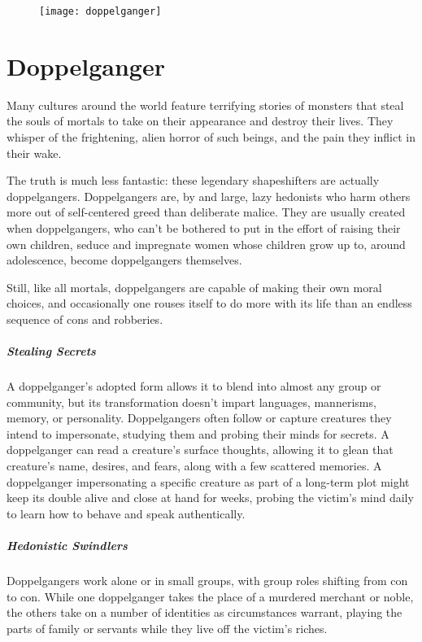 \begin{figure}[h]
	\texttt{[image: doppelganger]}
\end{figure}
{\vspace{-3em}}

\section{Doppelganger}
\par{Many cultures around the world feature terrifying stories of monsters that steal the souls of mortals to take on their appearance and destroy their lives. They whisper of the frightening, alien horror of such beings, and the pain they inflict in their wake.}
\par{The truth is much less fantastic: these legendary shapeshifters are actually doppelgangers. Doppelgangers are, by and large, lazy hedonists who harm others more out of self-centered greed than deliberate malice. They are usually created when doppelgangers, who can’t be bothered to put in the effort of raising their own children, seduce and impregnate women whose children grow up to, around adolescence, become doppelgangers themselves.}
\par{Still, like all mortals, doppelgangers are capable of making their own moral choices, and occasionally one rouses itself to do more with its life than an endless sequence of cons and robberies. \cite{d-hb}}

\subparagraph{Stealing Secrets}
{A doppelganger's adopted form allows it to blend into almost any group or community, but its transformation doesn't impart languages, mannerisms, memory, or personality. Doppelgangers often follow or capture creatures they intend to impersonate, studying them and probing their minds for secrets. A doppelganger can read a creature's surface thoughts, allowing it to glean that creature's name, desires, and fears, along with a few scattered memories. A doppelganger impersonating a specific creature as part of a long-term plot might keep its double alive and close at hand for weeks, probing the victim's mind daily to learn how to behave and speak authentically. \cite{d-sre}}

\subparagraph{Hedonistic Swindlers}
{Doppelgangers work alone or in small groups, with group roles shifting from con to con. While one doppelganger takes the place of a murdered merchant or noble, the others take on a number of identities as circumstances warrant, playing the parts of family or servants while they live off the victim's riches. \cite{d-sre}}

